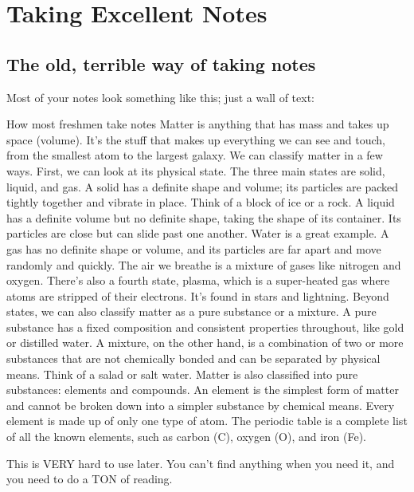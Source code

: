 \documentclass[../../main.tex]{subfiles}
\begin{document}
\chapter{Taking Excellent Notes}

\section{The old, terrible way of taking notes}

Most of your notes look something like this; just a wall of text:\\

\begin{boxRed}{How most freshmen take notes}
Matter is anything that has mass and takes up space (volume). It's the stuff that makes up everything we can see and touch, from the smallest atom to the largest galaxy. We can classify matter in a few ways. First, we can look at its physical state. The three main states are solid, liquid, and gas. A solid has a definite shape and volume; its particles are packed tightly together and vibrate in place. Think of a block of ice or a rock. A liquid has a definite volume but no definite shape, taking the shape of its container. Its particles are close but can slide past one another. Water is a great example. A gas has no definite shape or volume, and its particles are far apart and move randomly and quickly. The air we breathe is a mixture of gases like nitrogen and oxygen. There's also a fourth state, plasma, which is a super-heated gas where atoms are stripped of their electrons. It's found in stars and lightning. Beyond states, we can also classify matter as a pure substance or a mixture. A pure substance has a fixed composition and consistent properties throughout, like gold or distilled water. A mixture, on the other hand, is a combination of two or more substances that are not chemically bonded and can be separated by physical means. Think of a salad or salt water.  Matter is also classified into pure substances: elements and compounds. An element is the simplest form of matter and cannot be broken down into a simpler substance by chemical means. Every element is made up of only one type of atom. The periodic table is a complete list of all the known elements, such as carbon (C), oxygen (O), and iron (Fe).
\end{boxRed}

This is VERY hard to use later.  You can't find anything when you need it, and you need to do a TON of reading.\\
\end{document}
